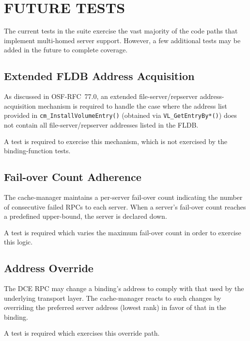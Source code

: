 %
%

\section{FUTURE TESTS}

The current tests in the suite exercise the vast majority of the code
paths that implement multi-homed server support.
However, a few additional tests may be added in the future to complete
coverage.

\subsection{Extended FLDB Address Acquisition}
\label{subsec:fldbxtra-addr}

As discussed in OSF-RFC~77.0, an extended file-server/repserver
address-acquisition mechanism is required to handle the case where
the address list provided in
{\tt cm\_InstallVolumeEntry()} (obtained via
{\tt VL\_GetEntryBy*()}) does not contain all
file-server/repserver addresses listed in the FLDB.

A test is required to exercise this mechanism, which is not exercised
by the binding-function tests.


\subsection{Fail-over Count Adherence}

The cache-manager maintains a per-server fail-over count indicating the
number of consecutive failed RPCs to each server.
When a server's fail-over count reaches a predefined upper-bound, the
server is declared down.

A test is required which varies the maximum fail-over count in
order to exercise this logic.


\subsection{Address Override}

The DCE RPC may change a binding's address to comply with that used by
the underlying transport layer.
The cache-manager reacts to such changes by overriding the preferred
server address (lowest rank) in favor of that in the binding.

A test is required which exercises this override path.

%
%


